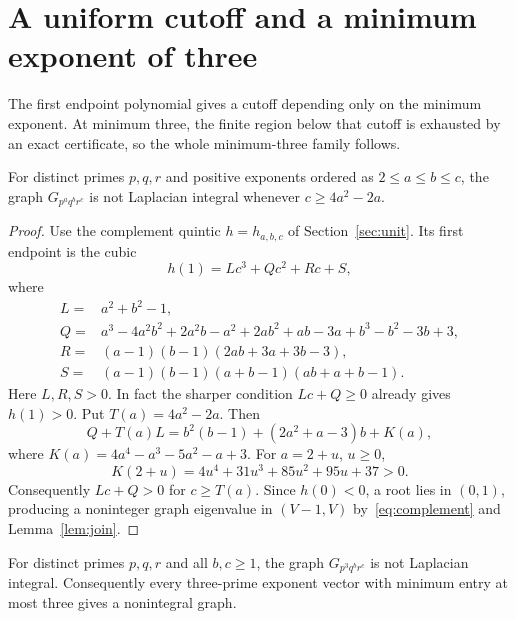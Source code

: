 \section{A uniform cutoff and a minimum exponent of three}
\label{sec:distinct-tail}

The first endpoint polynomial gives a cutoff depending only on the
minimum exponent. At minimum three, the finite region below that cutoff
is exhausted by an exact certificate, so the whole minimum-three family
follows.

\begin{proposition}
\label{prop:distinct-tail}
For distinct primes $p,q,r$ and positive exponents ordered as
$2\leq a\leq b\leq c$, the graph $G_{p^a q^b r^c}$ is not
Laplacian integral whenever $c\geq4a^2-2a$.
\end{proposition}

\begin{proof}
Use the complement quintic $h=h_{a,b,c}$ of Section~\ref{sec:unit}.
Its first endpoint is the cubic
\begin{equation}
\label{eq:general-first-endpoint}
h(1)=Lc^3+Qc^2+Rc+S,
\end{equation}
where
\begin{align*}
L={}&a^2+b^2-1,\\
Q={}&a^3-4a^2b^2+2a^2b-a^2+2ab^2+ab-3a
       +b^3-b^2-3b+3,\\
R={}&(a-1)(b-1)(2ab+3a+3b-3),\\
S={}&(a-1)(b-1)(a+b-1)(ab+a+b-1).
\end{align*}
Here $L,R,S>0$. In fact the sharper condition $Lc+Q\geq0$
already gives $h(1)>0$. Put $T(a)=4a^2-2a$. Then
\[
Q+T(a)L=b^2(b-1)+(2a^2+a-3)b+K(a),
\]
where $K(a)=4a^4-a^3-5a^2-a+3$. For $a=2+u$, $u\geq0$,
\[
K(2+u)=4u^4+31u^3+85u^2+95u+37>0.
\]
Consequently $Lc+Q>0$ for $c\geq T(a)$. Since $h(0)<0$,
a root lies in $(0,1)$, producing a noninteger graph eigenvalue in
$(V-1,V)$ by~\eqref{eq:complement} and Lemma~\ref{lem:join}.
\end{proof}

\begin{theorem}
\label{thm:minimum-three}
For distinct primes $p,q,r$ and all $b,c\geq1$, the graph
$G_{p^3q^br^c}$ is not Laplacian integral. Consequently every
three-prime exponent vector with minimum entry at most three gives a
nonintegral graph.
\end{theorem}

